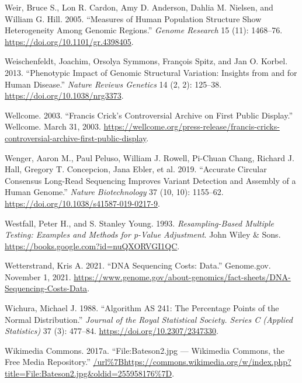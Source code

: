 \documentclass[
]{book}
\newlength{\cslhangindent}
\newlength{\cslentryspacingunit} %
\newenvironment{CSLReferences}[2] %
 {%
  \setlength{\parindent}{0pt}
  \ifodd #1
  \let\oldpar\par
  \def\par{\hangindent=\cslhangindent\oldpar}
  \fi
  \setlength{\parskip}{#2\cslentryspacingunit}
 }%
 {}
\begin{document}
\begin{CSLReferences}{1}{0}
\leavevmode{}%
Weir, Bruce S., Lon R. Cardon, Amy D. Anderson, Dahlia M. Nielsen, and William G. Hill. 2005. {``Measures of Human Population Structure Show Heterogeneity Among Genomic Regions.''} \emph{Genome Research} 15 (11): 1468--76. \url{https://doi.org/10.1101/gr.4398405}.

\leavevmode{}%
Weischenfeldt, Joachim, Orsolya Symmons, François Spitz, and Jan O. Korbel. 2013. {``Phenotypic Impact of Genomic Structural Variation: Insights from and for Human Disease.''} \emph{Nature Reviews Genetics} 14 (2, 2): 125--38. \url{https://doi.org/10.1038/nrg3373}.

\leavevmode{}%
Wellcome. 2003. {``Francis {Crick}'s Controversial Archive on First Public Display.''} {Wellcome}. March 31, 2003. \url{https://wellcome.org/press-release/francis-cricks-controversial-archive-first-public-display}.

\leavevmode{}%
Wenger, Aaron M., Paul Peluso, William J. Rowell, Pi-Chuan Chang, Richard J. Hall, Gregory T. Concepcion, Jana Ebler, et al. 2019. {``Accurate Circular Consensus Long-Read Sequencing Improves Variant Detection and Assembly of a Human Genome.''} \emph{Nature Biotechnology} 37 (10, 10): 1155--62. \url{https://doi.org/10.1038/s41587-019-0217-9}.

\leavevmode{}%
Westfall, Peter H., and S. Stanley Young. 1993. \emph{Resampling-{Based Multiple Testing}: {Examples} and {Methods} for p-{Value Adjustment}}. {John Wiley \& Sons}. \url{https://books.google.com?id=nuQXORVGI1QC}.

\leavevmode{}%
Wetterstrand, Kris A. 2021. {``{DNA Sequencing Costs}: {Data}.''} {Genome.gov}. November 1, 2021. \url{https://www.genome.gov/about-genomics/fact-sheets/DNA-Sequencing-Costs-Data}.

\leavevmode{}%
Wichura, Michael J. 1988. {``Algorithm {AS} 241: {The Percentage Points} of the {Normal Distribution}.''} \emph{Journal of the Royal Statistical Society. Series C (Applied Statistics)} 37 (3): 477--84. \url{https://doi.org/10.2307/2347330}.

\leavevmode{}%
Wikimedia Commons. 2017a. {``File:Bateson2.jpg --- Wikimedia Commons{,} the Free Media Repository.''} \url{/url\%7Bhttps://commons.wikimedia.org/w/index.php?title=File:Bateson2.jpg\&oldid=255958176\%7D}.


\end{CSLReferences}
\end{document}
